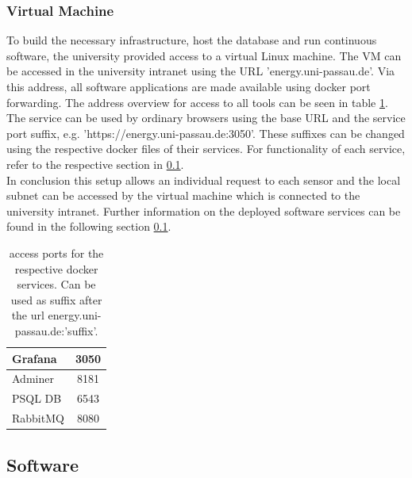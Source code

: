 \subsubsection{Virtual Machine}
To build the necessary infrastructure, host the database and run continuous software, the university provided access to a virtual Linux machine. The VM can be accessed in the university intranet using the URL 'energy.uni-passau.de'. Via this address, all software applications are made available using docker port forwarding. The address overview for access to all tools can be seen in table \ref{tab:access}. The service can be used by ordinary browsers using the base URL and the service port suffix, e.g. 'https://energy.uni-passau.de:3050'. These suffixes can be changed using the respective docker files of their services. For functionality of each service, refer to the respective section in \ref{subsec:software}.\\
In conclusion this setup allows an individual request to each sensor and the local subnet can be accessed by the virtual machine which is connected to the university intranet. Further information on the deployed software services can be found in the following section \ref{subsec:software}.
\begin{table}
\centering
\begin{tabular}{l|c}
	\hline
	Grafana & 3050 \\ \hline
	Adminer & 8181 \\ \hline
	PSQL DB & 6543 \\ \hline
	RabbitMQ & 8080
\end{tabular}
\caption{access ports for the respective docker services. Can be used as suffix after the url energy.uni-passau.de:'suffix'.}
\label{tab:access}
\end{table}
\subsection{Software}\label{subsec:software}

